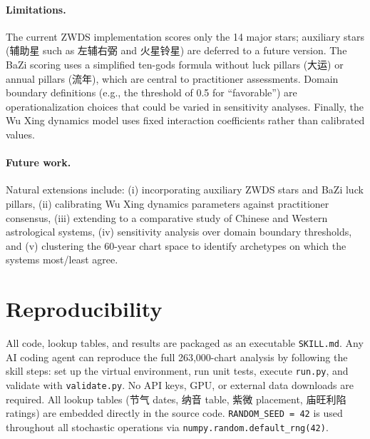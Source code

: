 \documentclass[11pt]{article}
\begin{document}
\paragraph{Limitations.}
The current ZWDS implementation scores only the 14 major stars; auxiliary stars (辅助星 such as 左辅右弼 and 火星铃星) are deferred to a future version.
The BaZi scoring uses a simplified ten-gods formula without luck pillars (大运) or annual pillars (流年), which are central to practitioner assessments.
Domain boundary definitions (e.g., the threshold of 0.5 for ``favorable'') are operationalization choices that could be varied in sensitivity analyses.
Finally, the Wu Xing dynamics model uses fixed interaction coefficients rather than calibrated values.

\paragraph{Future work.}
Natural extensions include: (i) incorporating auxiliary ZWDS stars and BaZi luck pillars, (ii) calibrating Wu Xing dynamics parameters against practitioner consensus, (iii) extending to a comparative study of Chinese and Western astrological systems, (iv) sensitivity analysis over domain boundary thresholds, and (v) clustering the 60-year chart space to identify archetypes on which the systems most/least agree.

\section*{Reproducibility}

All code, lookup tables, and results are packaged as an executable \texttt{SKILL.md}.
Any AI coding agent can reproduce the full 263,000-chart analysis by following the skill steps: set up the virtual environment, run unit tests, execute \texttt{run.py}, and validate with \texttt{validate.py}.
No API keys, GPU, or external data downloads are required.
All lookup tables (节气 dates, 纳音 table, 紫微 placement, 庙旺利陷 ratings) are embedded directly in the source code.
\texttt{RANDOM\_SEED = 42} is used throughout all stochastic operations via \texttt{numpy.random.default\_rng(42)}.
\end{document}
